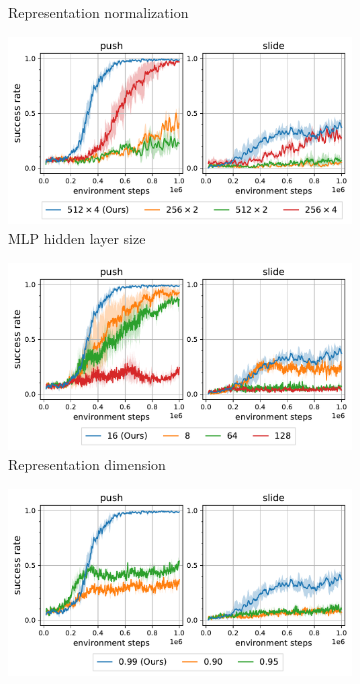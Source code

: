 \documentclass{article} %
\begin{document}
\begin{figure}[t]
\begin{subfigure}[c]{0.49\textwidth}
        \caption{Representation normalization}
    \end{subfigure}
    \hfill
    \begin{subfigure}[c]{0.49\textwidth}
        \centering
        \includegraphics[width=\linewidth]{figures/hyperparam_ablation/MLP_hidden_layer_sizes.pdf}
        \caption{MLP hidden layer size\protect\footnotemark}
    \end{subfigure}
    \vfill
    \begin{subfigure}[c]{0.49\textwidth}
        \centering
        \includegraphics[width=\linewidth]{figures/hyperparam_ablation/representation_dimension.pdf}
        \caption{Representation dimension}
    \end{subfigure}
    \hfill
    \begin{subfigure}[c]{0.49\textwidth}
        \centering
        \includegraphics[width=\linewidth]{figures/hyperparam_ablation/gamma.pdf}

\end{subfigure}
\end{figure}
\end{document}

